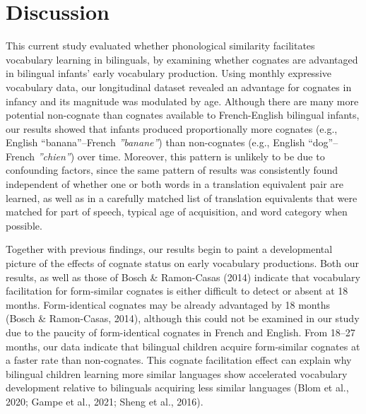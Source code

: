 \documentclass[
  english,
  ,man,floatsintext]{apa6}
\begin{document}
\hypertarget{discussion}{%
\section{Discussion}\label{discussion}}

This current study evaluated whether phonological similarity facilitates vocabulary learning in bilinguals, by examining whether cognates are advantaged in bilingual infants' early vocabulary production. Using monthly expressive vocabulary data, our longitudinal dataset revealed an advantage for cognates in infancy and its magnitude was modulated by age. Although there are many more potential non-cognate than cognates available to French-English bilingual infants, our results showed that infants produced proportionally more cognates (e.g., English ``banana''--French \emph{''banane''}) than non-cognates (e.g., English ``dog''--French \emph{''chien''}) over time. Moreover, this pattern is unlikely to be due to confounding factors, since the same pattern of results was consistently found independent of whether one or both words in a translation equivalent pair are learned, as well as in a carefully matched list of translation equivalents that were matched for part of speech, typical age of acquisition, and word category when possible.

Together with previous findings, our results begin to paint a developmental picture of the effects of cognate status on early vocabulary productions. Both our results, as well as those of Bosch \& Ramon-Casas (2014) indicate that vocabulary facilitation for form-similar cognates is either difficult to detect or absent at 18 months. Form-identical cognates may be already advantaged by 18 months (Bosch \& Ramon-Casas, 2014), although this could not be examined in our study due to the paucity of form-identical cognates in French and English. From 18--27 months, our data indicate that bilingual children acquire form-similar cognates at a faster rate than non-cognates. This cognate facilitation effect can explain why bilingual children learning more similar languages show accelerated vocabulary development relative to bilinguals acquiring less similar languages (Blom et al., 2020; Gampe et al., 2021; Sheng et al., 2016).
\end{document}
